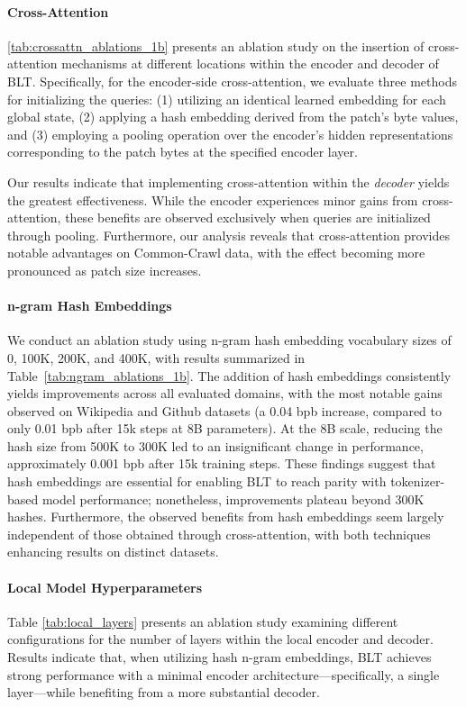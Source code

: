 \paragraph{Cross-Attention}
\autoref{tab:crossattn_ablations_1b} presents an ablation study on the insertion of cross-attention mechanisms at different locations within the encoder and decoder of {\textsc BLT}. Specifically, for the encoder-side cross-attention, we evaluate three methods for initializing the queries: (1) utilizing an identical learned embedding for each global state, (2) applying a hash embedding derived from the patch's byte values, and (3) employing a pooling operation over the encoder’s hidden representations corresponding to the patch bytes at the specified encoder layer.

Our results indicate that implementing cross-attention within the \textit{decoder} yields the greatest effectiveness. While the encoder experiences minor gains from cross-attention, these benefits are observed exclusively when queries are initialized through pooling. Furthermore, our analysis reveals that cross-attention provides notable advantages on Common-Crawl data, with the effect becoming more pronounced as patch size increases.

\paragraph{n-gram Hash Embeddings} 

We conduct an ablation study using n-gram hash embedding vocabulary sizes of 0, 100K, 200K, and 400K, with results summarized in Table~\ref{tab:ngram_ablations_1b}. The addition of hash embeddings consistently yields improvements across all evaluated domains, with the most notable gains observed on Wikipedia and Github datasets (a 0.04 bpb increase, compared to only 0.01 bpb after 15k steps at 8B parameters). At the 8B scale, reducing the hash size from 500K to 300K led to an insignificant change in performance, approximately 0.001 bpb after 15k training steps. These findings suggest that hash embeddings are essential for enabling {\textsc BLT} to reach parity with tokenizer-based model performance; nonetheless, improvements plateau beyond 300K hashes. Furthermore, the observed benefits from hash embeddings seem largely independent of those obtained through cross-attention, with both techniques enhancing results on distinct datasets.

\paragraph{Local Model Hyperparameters} Table \ref{tab:local_layers} presents an ablation study examining different configurations for the number of layers within the local encoder and decoder. Results indicate that, when utilizing hash n-gram embeddings, {\textsc BLT} achieves strong performance with a minimal encoder architecture—specifically, a single layer—while benefiting from a more substantial decoder.

